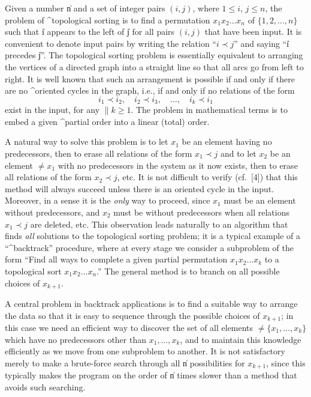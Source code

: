 Given a number \|n and a set of integer pairs $(i,j)$, where $1 \le
i$, $j \le n$, the problem of ^{topological sorting} is to find a
permutation $x_1x_2\ldots x_n$ of $\{1,2,\ldots,n\}$ such that \|i
appears to the left of \|j for all pairs $(i,j)$ that have been input.
It is convenient to denote input pairs by writing the relation
``$i\prec j$'' and saying ``\|i precedes \|j''. The topological
sorting problem is essentially equivalent to arranging the vertices of
a directed graph into a straight line so that all arcs go from left to
right. It is well known that such an arrangement is possible if and
only if there are no ^{oriented cycles} in the graph, i.e., if and only
if no relations of the form $$i_1\prec i_2,\quad i_2 \prec i_3,\quad
\ldots,\quad i_k \prec i_1$$ exist in the input, for any $\|k \ge 1$.
The problem in mathematical terms is to embed a given ^{partial order}
into a linear (total) order.

A natural way to solve this problem is to let $x_1$ be an element
having no predecessors, then to erase all relations of the form $x_1
\prec j$ and to let $x_2$ be an element $\ne x_1$ with no predecessors
in the system as it now exists, then to erase all relations of the
form $x_2 \prec j$, etc. It is not difficult to verify (cf.~[4]) that
this method will always succeed unless there is an oriented cycle in
the input. Moreover, in a sense it is the {\em only\/} way to proceed, since
$x_1$ must be an element without predecessors, and $x_2$ must be
without predecessors when all relations $x_1 \prec j$ are deleted, etc. This
observation leads naturally to an algorithm that finds {\em all\/} solutions
to the topological sorting problem; it is a typical example of a
``^{backtrack}'' procedure\cite{2,3}, where at every stage we consider a
subproblem of the form ``Find all ways to complete a given partial
permutation $x_1x_2\ldots x_k$ to a topological sort $x_1x_2\ldots
x_n$.'' The general method is to branch on all possible choices of
$x_{k+1}$.

A central problem in backtrack applications is to find a suitable way
to arrange the data so that it is easy to sequence through the
possible choices of $x_{k+1}$; in this case we need an efficient way to
discover the set of all elements $\ne \{x_1,\ldots,x_k\}$ which have no
predecessors other than $x_1,\ldots,x_k$, and to maintain this knowledge
efficiently as we move from one subproblem to another. It is not
satisfactory merely to make a brute-force search through all \|n 
possibilities for $x_{k+1}$, since this typically makes the program on the
order of \|n times slower than a method that avoids such searching.

